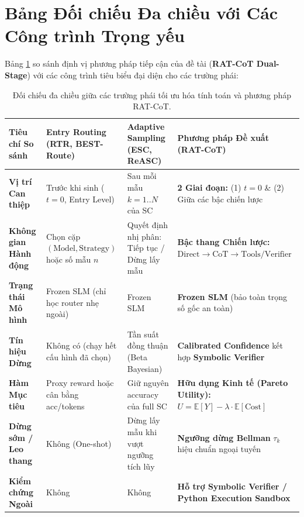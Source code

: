 \documentclass[11pt,a4paper]{report}
\begin{document}
\section{Bảng Đối chiếu Đa chiều với Các Công trình Trọng yếu}

Bảng \ref{tab:taxonomy_matrix} so sánh định vị phương pháp tiếp cận của đề tài (\textbf{RAT-CoT Dual-Stage}) với các công trình tiêu biểu đại diện cho các trường phái:

\begin{table}[h!]
\centering\scriptsize
\begin{tabularx}{\textwidth}{lXXX}
\toprule
\textbf{Tiêu chí So sánh} & \textbf{Entry Routing (RTR, BEST-Route)} & \textbf{Adaptive Sampling (ESC, ReASC)} & \textbf{Phương pháp Đề xuất (RAT-CoT)} \\
\midrule
\textbf{Vị trí Can thiệp} & Trước khi sinh ($t=0$, Entry Level) & Sau mỗi mẫu $k=1..N$ của SC & \textbf{2 Giai đoạn:} (1) $t=0$ \& (2) Giữa các bậc chiến lược \\
\textbf{Không gian Hành động} & Chọn cặp $(\text{Model}, \text{Strategy})$ hoặc số mẫu $n$ & Quyết định nhị phân: Tiếp tục / Dừng lấy mẫu & \textbf{Bậc thang Chiến lược:} $\text{Direct} \to \text{CoT} \to \text{Tools/Verifier}$ \\
\textbf{Trạng thái Mô hình} & Frozen SLM (chỉ học router nhẹ ngoài) & Frozen SLM & \textbf{Frozen SLM} (bảo toàn trọng số gốc an toàn) \\
\textbf{Tín hiệu Dừng} & Không có (chạy hết cấu hình đã chọn) & Tần suất đồng thuận (Beta Bayesian) & \textbf{Calibrated Confidence} kết hợp \textbf{Symbolic Verifier} \\
\textbf{Hàm Mục tiêu} & Proxy reward hoặc cân bằng acc/tokens & Giữ nguyên accuracy của full SC & \textbf{Hữu dụng Kinh tế (Pareto Utility):} $U = \mathbb{E}[Y] - \lambda \cdot \mathbb{E}[\text{Cost}]$ \\
\textbf{Dừng sớm / Leo thang} & Không (One-shot) & Dừng lấy mẫu khi vượt ngưỡng tích lũy & \textbf{Ngưỡng dừng Bellman} $\tau_k$ hiệu chuẩn ngoại tuyến \\
\textbf{Kiểm chứng Ngoài} & Không & Không & \textbf{Hỗ trợ Symbolic Verifier / Python Execution Sandbox} \\
\bottomrule
\end{tabularx}
\caption{Đối chiếu đa chiều giữa các trường phái tối ưu hóa tính toán và phương pháp RAT-CoT.}\label{tab:taxonomy_matrix}
\end{table}
\end{document}
